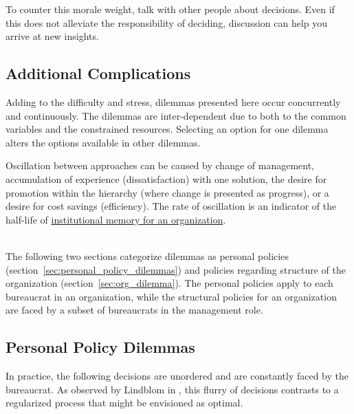 To counter this morale weight, talk with other people about decisions. 
Even if this does not alleviate the responsibility of deciding, discussion can help you arrive at new insights. 

\subsection*{Additional Complications}
Adding to the difficulty and stress, dilemmas presented here occur concurrently and continuously. The dilemmas are inter-dependent due to both to the common variables and the constrained resources.
Selecting an option for one dilemma alters the options available in other dilemmas.

Oscillation between approaches can be caused by change of management, accumulation of experience (dissatisfaction) with one solution, the desire for promotion within the hierarchy (where change is presented as progress), or a desire for cost savings (efficiency). The rate of oscillation is an indicator of the half-life of \href{https://en.wikipedia.org/wiki/Institutional_memory}{institutional memory for an organization}.  

\ \\

The following two sections categorize dilemmas as personal policies (section~\ref{sec:personal_policy_dilemmas}) and policies regarding structure of the organization (section~\ref{sec:org_dilemma}). The personal policies apply to each bureaucrat in an organization, while the structural policies for an organization are faced by a subset of bureaucrats in the management role. 

\subsection*{Personal Policy Dilemmas \label{sec:personal_policy_dilemmas}}

In practice, the following decisions are unordered and are constantly faced by the bureaucrat. As observed by Lindblom in \cite{1959_Lindblom}, this flurry of decisions contrasts to a regularized process that might be envisioned as optimal.


